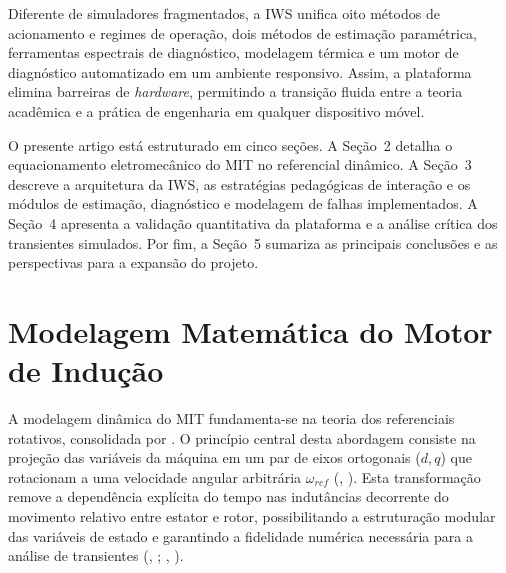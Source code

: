 \documentclass[a4paper]{ifacconf}
\begin{document}
Diferente de simuladores fragmentados, a IWS unifica oito métodos de acionamento e regimes de operação, dois métodos de estimação paramétrica, ferramentas espectrais de diagnóstico, modelagem térmica e um motor de diagnóstico automatizado em um ambiente responsivo. Assim, a plataforma elimina barreiras de \textit{hardware}, permitindo a transição fluida entre a teoria acadêmica e a prática de engenharia em qualquer dispositivo móvel.

O presente artigo está estruturado em cinco seções. A Seção~2 detalha o equacionamento eletromecânico do MIT no referencial dinâmico. A Seção~3 descreve a arquitetura da IWS, as estratégias pedagógicas de interação e os módulos de estimação, diagnóstico e modelagem de falhas implementados. A Seção~4 apresenta a validação quantitativa da plataforma e a análise crítica dos transientes simulados. Por fim, a Seção~5 sumariza as principais conclusões e as perspectivas para a expansão do projeto.

\section{Modelagem Matemática do Motor de Indução}
\label{sec:modelagem}

A modelagem dinâmica do MIT fundamenta-se na teoria dos referenciais rotativos, consolidada por \cite{KrauseThomas}. O princípio central desta abordagem consiste na projeção das variáveis da máquina em um par de eixos ortogonais ($d, q$) que rotacionam a uma velocidade angular arbitrária $\omega_{ref}$ (\citeauthor{usta2024mathematical}, \citeyear{usta2024mathematical}). Esta transformação remove a dependência explícita do tempo nas indutâncias decorrente do movimento relativo entre estator e rotor, possibilitando a estruturação modular das variáveis de estado e garantindo a fidelidade numérica necessária para a análise de transientes (\citeauthor{sengamalai2022three}, \citeyear{sengamalai2022three}; \citeauthor{leroux2022static}, \citeyear{leroux2022static}).
\end{document}
